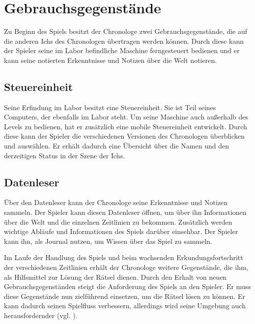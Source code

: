 \section{Gebrauchsgegenstände}
Zu Beginn des Spiels besitzt der Chronologe zwei Gebrauchsgegenstände, die auf die anderen Ichs des Chronologen übertragen werden können. Durch diese kann der Spieler seine im Labor befindliche Maschine ferngesteuert bedienen und er kann seine notierten Erkenntnisse und Notizen über die Welt notieren.

\subsection{Steuereinheit}
Seine Erfindung im Labor besitzt eine Steuereinheit. Sie ist Teil seines Computers, der ebenfalls im Labor steht. Um seine Maschine auch außerhalb des Levels zu bedienen, hat er zusätzlich eine mobile Steuereinheit entwickelt. Durch diese kann der Spieler die verschiedenen Versionen des Chronologen überblicken und auswählen. Er erhält dadurch eine Übersicht über die Namen und den derzeitigen Status in der Szene der Ichs.

\subsection{Datenleser}\label{sec:concept_datenleser}
Über den Datenleser kann der Chronologe seine Erkenntnisse und Notizen sammeln. Der Spieler kann diesen Datenleser öffnen, um über ihn Informationen über die Welt und die einzelnen Zeitlinien zu bekommen. Zusätzlich werden wichtige Abläufe und Informationen des Spiels darüber einsehbar. Der Spieler kann ihn, als Journal nutzen, um Wissen über das Spiel zu sammeln.

Im Laufe der Handlung des Spiels und beim wachsenden Erkundungsfortschritt der verschiedenen Zeitlinien erhält der Chronologe weitere Gegenstände, die ihm, als Hilfsmittel zur Lösung der Rätsel dienen. Durch den Erhalt von neuen Gebrauchsgegenständen steigt die Anforderung des Spiels an den Spieler. Er muss diese Gegenstände nun zielführend einsetzen, um die Rätsel lösen zu können. Er kann dadurch seinen Spielfluss verbessern, allerdings wird seine Umgebung auch herausfordernder (vgl. \cite[S. 290ff]{schellJ}).

